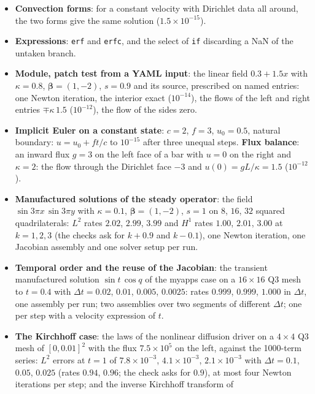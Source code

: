 \documentclass[11pt]{article}
\DeclareRobustCommand{\code}[1]{{\def\_{\textunderscore\allowbreak}\texttt{#1}}}
\begin{document}
\begin{itemize}[nosep]
  \item \textbf{Convection forms}: for a constant velocity with Dirichlet
    data all around, the two forms give the same solution ($1.5\times10^{-15}$).
  \item \textbf{Expressions}: \code{erf} and \code{erfc}, and the select
    of \code{if} discarding a NaN of the untaken branch.
  \item \textbf{Module, patch test from a YAML input}: the linear field
    $0.3 + 1.5x$ with $\kappa = 0.8$, $\bm\beta = (1, -2)$, $s = 0.9$ and its
    source, prescribed on named entries: one Newton iteration, the interior
    exact ($10^{-14}$), the flows of the left and right entries
    $\mp\kappa\,1.5$ ($10^{-12}$), the flow of the sides zero.
  \item \textbf{Implicit Euler on a constant state}: $c = 2$, $f = 3$,
    $u_0 = 0.5$, natural boundary: $u = u_0 + f t/c$ to $10^{-15}$ after
    three unequal steps.  \textbf{Flux balance}: an inward flux $g = 3$ on
    the left face of a bar with $u = 0$ on the right and $\kappa = 2$: the
    flow through the Dirichlet face $-3$ and $u(0) = gL/\kappa = 1.5$
    ($10^{-12}$).
  \item \textbf{Manufactured solutions of the steady operator}: the field
    $\sin 3\pi x\,\sin 3\pi y$ with $\kappa = 0.1$, $\bm\beta = (1, -2)$,
    $s = 1$ on $8$, $16$, $32$ squared quadrilaterals: $L^2$ rates $2.02$,
    $2.99$, $3.99$ and $H^1$ rates $1.00$, $2.01$, $3.00$ at $k = 1, 2, 3$
    (the checks ask for $k + 0.9$ and $k - 0.1$), one Newton iteration, one
    Jacobian assembly and one solver setup per run.
  \item \textbf{Temporal order and the reuse of the Jacobian}: the transient
    manufactured solution $\sin t\,\cos q$ of the myapps case on a $16\times16$
    Q3 mesh to $t = 0.4$ with $\Delta t = 0.02$, $0.01$, $0.005$, $0.0025$:
    rates $0.999$, $0.999$, $1.000$ in $\Delta t$, one assembly per run; two
    assemblies over two segments of different $\Delta t$; one per step with
    a velocity expression of $t$.
  \item \textbf{The Kirchhoff case}: the laws of the nonlinear diffusion
    driver on a $4\times4$ Q3 mesh of $[0, 0.01]^2$ with the flux $7.5\times10^5$
    on the left, against the 1000-term series: $L^2$ errors at $t = 1$ of
    $7.8\times10^{-3}$, $4.1\times10^{-3}$, $2.1\times10^{-3}$ with $\Delta t = 0.1$,
    $0.05$, $0.025$ (rates $0.94$, $0.96$; the check asks for $0.9$), at most
    four Newton iterations per step; and the inverse Kirchhoff transform of

\end{itemize}
\end{document}
